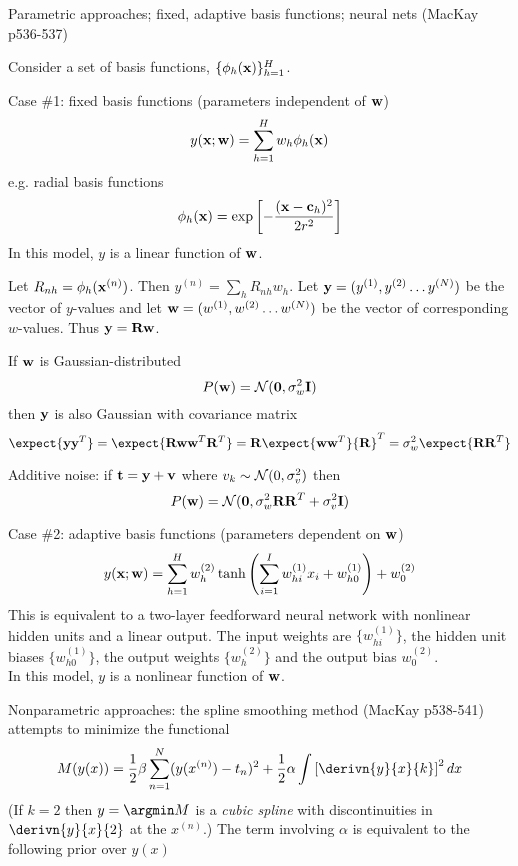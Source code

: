 \documentclass{beamer}
\begin{document}
\begin{frame}{}
 \itemb
\item Parametric approaches; fixed, adaptive basis functions; neural nets (MacKay p536-537)
 \itemb
 \item Consider a set of basis functions, $\{ \phi_h({\bf x}) \}_{h=1}^H$.
 \item Case \#1: fixed basis functions (parameters independent of ${\bf w}$)
\[
y({\bf x};{\bf w}) = \sum_{h=1}^H w_h \phi_h({\bf x})
\]
e.g. radial basis functions
\[
\phi_h({\bf x}) = \exp \left[ -\frac{({\bf x}-{\bf c}_h)^2}{2r^2} \right]
\]
In this model, $y$ is a linear function of ${\bf w}$.
  \itemb
  \item Let $R_{nh} = \phi_h ({\bf x}^{(n)})$.
Then $y^{(n)} = \sum_h R_{nh} w_h$.
Let ${\bf y} = (y^{(1)}, y^{(2)} \ldots y^{(N)})$ be the vector of $y$-values and
let ${\bf w} = (w^{(1)}, w^{(2)} \ldots w^{(N)})$ be the vector of corresponding $w$-values.
Thus ${\bf y} = {\bf Rw}$.
  \item If ${\bf w}$ is Gaussian-distributed
\[
P({\bf w}) = {\cal N}({\bf 0},\sigma^2_w {\bf I})
\]
then ${\bf y}$ is also Gaussian with covariance matrix
\[
\expect{{\bf yy}^T} = \expect{{\bf Rww}^T{\bf R}^T}
 = {\bf R}\expect{{\bf ww}^T}{\bf R}^T = \sigma^2_w \expect{{\bf RR}^T}
\]
  \item Additive noise: if ${\bf t} = {\bf y} + {\bf v}$ where $v_k \sim {\cal N}(0,\sigma^2_v)$ then
\[
P({\bf w}) = {\cal N}({\bf 0},\sigma^2_w {\bf RR}^T + \sigma^2_v {\bf I})
\]
  \iteme
 \item Case \#2: adaptive basis functions (parameters dependent on ${\bf w}$)
\[
y({\bf x};{\bf w}) = \sum_{h=1}^H w_h^{(2)} \tanh \left( \sum_{i=1}^I w_{hi}^{(1)} x_i + w_{h0}^{(1)} \right) + w_0^{(2)}
\]
This is equivalent to a two-layer feedforward neural network with nonlinear hidden units and a linear output.
The input weights are $\{ w_{hi}^{(1)} \}$, the hidden unit biases $\{ w_{h0}^{(1)} \}$,
the output weights $\{ w_h^{(2)} \}$ and the output bias $w_0^{(2)}$.
\\
In this model, $y$ is a nonlinear function of ${\bf w}$.
 \iteme
\item Nonparametric approaches: the spline smoothing method (MacKay p538-541) attempts to minimize the functional
\[
M(y(x)) = \frac{1}{2} \beta \sum_{n=1}^N (y(x^{(n)}) - t_n)^2 + \frac{1}{2} \alpha \int \left[ \derivn{y}{x}{k} \right]^2 dx
\]
(If $k=2$ then $y = \argmin M$ is a {\em cubic spline} with discontinuities in $\derivn{y}{x}{2}$ at the $x^{(n)}$.)
The term involving $\alpha$ is equivalent to the following prior over $y(x)$

\end{frame}
\end{document}
